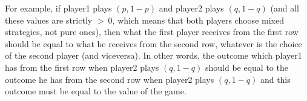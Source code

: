\documentclass[pt11,a4paper,twoside,reqno,openright]{paper}
\begin{document}
\begin{itemize}
		\noindent For example, if player1 plays $\left(p,1-p\right)$ 
		and player2 plays $\left(q,1-q\right)$ (and all these 
		values are strictly $>~0$, which means that both players 
		choose mixed strategies, not pure ones), then what the first 
		player receives from the first row should be equal to what he 
		receives from the second row, whatever is the choice of the 
		second player (and viceversa). In other words, the outcome 
		which player1 has from the first row when player2 plays 
		$\left(q,1-q\right)$ should be equal to the outcome he has 
		from the second row when player2 plays $\left(q,1-q\right)$ 
		and this outcome must be equal to the value of the game.
\end{itemize}
\end{document}
